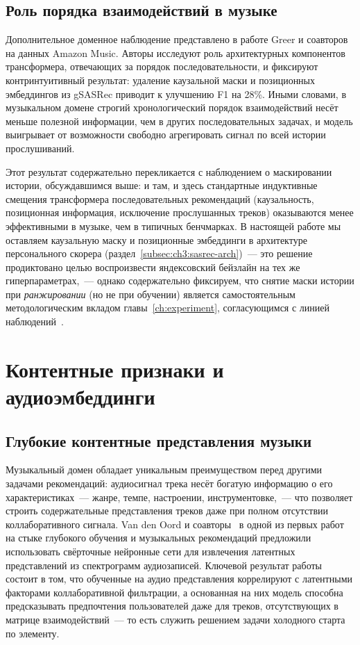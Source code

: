\subsection{Роль порядка взаимодействий в музыке}
\label{subsec:ch1:order}

Дополнительное доменное наблюдение представлено в работе Greer и соавторов~\cite{greer2025beyond} на данных Amazon Music. Авторы исследуют роль архитектурных компонентов трансформера, отвечающих за порядок последовательности, и фиксируют контринтуитивный результат: удаление каузальной маски и позиционных эмбеддингов из gSASRec приводит к улучшению F1 на 28\%. Иными словами, в музыкальном домене строгий хронологический порядок взаимодействий несёт меньше полезной информации, чем в других последовательных задачах, и модель выигрывает от возможности свободно агрегировать сигнал по всей истории прослушиваний.

Этот результат содержательно перекликается с наблюдением о маскировании истории, обсуждавшимся выше: и там, и здесь стандартные индуктивные смещения трансформера последовательных рекомендаций (каузальность, позиционная информация, исключение прослушанных треков) оказываются менее эффективными в музыке, чем в типичных бенчмарках. В настоящей работе мы оставляем каузальную маску и позиционные эмбеддинги в архитектуре персонального скорера (раздел~\ref{subsec:ch3:sasrec-arch})~--- это решение продиктовано целью воспроизвести яндексовский бейзлайн на тех же гиперпараметрах,~--- однако содержательно фиксируем, что снятие маски истории при \emph{ранжировании} (но не при обучении) является самостоятельным методологическим вкладом главы~\ref{ch:experiment}, согласующимся с линией наблюдений~\cite{abbattista2024sequential, greer2025beyond}.

\section{Контентные признаки и аудиоэмбеддинги}
\label{sec:ch1:content}

\subsection{Глубокие контентные представления музыки}
\label{subsec:ch1:vandenoord}

Музыкальный домен обладает уникальным преимуществом перед другими задачами рекомендаций: аудиосигнал трека несёт богатую информацию о его характеристиках~--- жанре, темпе, настроении, инструментовке,~--- что позволяет строить содержательные представления треков даже при полном отсутствии коллаборативного сигнала. Van den Oord и соавторы~\cite{vandeoord2013deep_music} в одной из первых работ на стыке глубокого обучения и музыкальных рекомендаций предложили использовать свёрточные нейронные сети для извлечения латентных представлений из спектрограмм аудиозаписей. Ключевой результат работы состоит в том, что обученные на аудио представления коррелируют с латентными факторами коллаборативной фильтрации, а основанная на них модель способна предсказывать предпочтения пользователей даже для треков, отсутствующих в матрице взаимодействий~--- то есть служить решением задачи холодного старта по элементу.


